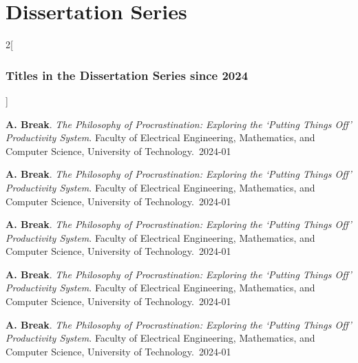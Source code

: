 

\chapter{Dissertation Series}%
\label{chap:dissertation-series}

\newcommand*{\promitem}[4]{\noindent \textbf{#1}. \emph{#2}. #3.~\mbox{#4}\medskip}

\pagestyle{empty}

\setlength{\columnsep}{2em}

\begin{multicols*}{2}[\subsection*{Titles in the Dissertation Series since 2024}]

\promitem{A. Break}
         {The Philosophy of Procrastination: Exploring the `Putting Things Off' Productivity System}
         {Faculty of Electrical Engineering, Mathematics, and Computer Science, University of Technology}
         {2024-01}

\promitem{A. Break}
         {The Philosophy of Procrastination: Exploring the `Putting Things Off' Productivity System}
         {Faculty of Electrical Engineering, Mathematics, and Computer Science, University of Technology}
         {2024-01}

\promitem{A. Break}
         {The Philosophy of Procrastination: Exploring the `Putting Things Off' Productivity System}
         {Faculty of Electrical Engineering, Mathematics, and Computer Science, University of Technology}
         {2024-01}

\promitem{A. Break}
         {The Philosophy of Procrastination: Exploring the `Putting Things Off' Productivity System}
         {Faculty of Electrical Engineering, Mathematics, and Computer Science, University of Technology}
         {2024-01}

\promitem{A. Break}
         {The Philosophy of Procrastination: Exploring the `Putting Things Off' Productivity System}
         {Faculty of Electrical Engineering, Mathematics, and Computer Science, University of Technology}
         {2024-01}


\end{multicols*}
